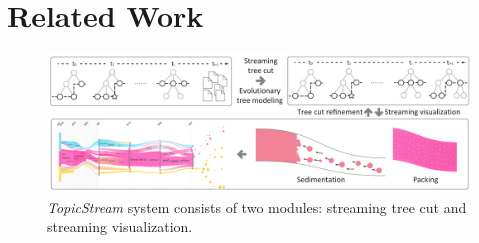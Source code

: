 
\section{Related Work}\label{sec:related-work}

\begin{figure}[t]
  \centering

  \includegraphics[width=\linewidth]{fig/system}
  \vspace{-5mm}
  \caption{\emph{\normalsize TopicStream} system consists of two modules: streaming tree cut and streaming visualization.}
  \label{fig:overview}
  \vspace{-2mm}
\end{figure}


